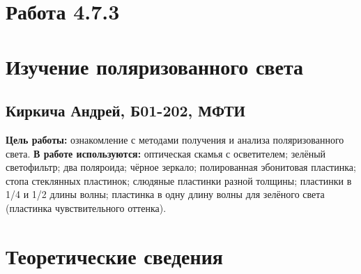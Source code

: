 


\section*{Работа 4.7.3}	
\section*{Изучение поляризованного света}
\subsection*{Киркича Андрей, Б01-202, МФТИ}
\textbf{Цель работы: }
ознакомление с методами получения и анализа поляризованного света.
	\n\n
	\textbf{В работе используются: }
оптическая скамья с осветителем; зелёный светофильтр; два поляроида; чёрное зеркало; полированная эбонитовая пластинка; стопа стеклянных пластинок; слюдяные пластинки разной толщины; пластинки в 1/4 и 1/2 длины волны; пластинка в одну длину волны для зелёного света (пластинка чувствительного оттенка).

\section*{Теоретические сведения}
